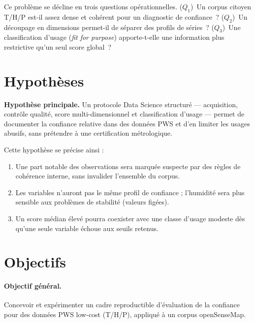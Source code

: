 \documentclass[12pt,a4paper]{report}
\begin{document}
Ce problème se décline en trois questions opérationnelles. ($Q_1$)~Un corpus
citoyen T/H/P est-il assez dense et cohérent pour un diagnostic de confiance~?
($Q_2$)~Un découpage en dimensions permet-il de séparer des profils de séries~?
($Q_3$)~Une classification d'usage (\textit{fit for purpose}) apporte-t-elle une
information plus restrictive qu'un seul score global~?

\section*{Hypothèses}

\textbf{Hypothèse principale.} Un protocole Data Science structuré ---
acquisition, contrôle qualité, score multi-dimensionnel et classification
d'usage --- permet de documenter la confiance relative dans des données PWS et
d'en limiter les usages abusifs, sans prétendre à une certification
métrologique.

Cette hypothèse se précise ainsi :
\begin{enumerate}
  \item[$H_1$] Une part notable des observations sera marquée suspecte par des
        règles de cohérence interne, sans invalider l'ensemble du corpus.
  \item[$H_2$] Les variables n'auront pas le même profil de confiance ;
        l'humidité sera plus sensible aux problèmes de stabilité (valeurs
        figées).
  \item[$H_3$] Un score médian élevé pourra coexister avec une classe d'usage
        modeste dès qu'une seule variable échoue aux seuils retenus.
\end{enumerate}


\section*{Objectifs}

\paragraph{Objectif général.}
Concevoir et expérimenter un cadre reproductible d'évaluation de la confiance
pour des données PWS low-cost (T/H/P), appliqué à un corpus openSenseMap.
\end{document}
